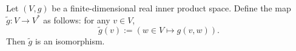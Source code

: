 \begin{proposition}
  Let $(V, g)$ be a finite-dimensional real inner product space.
  Define the map $\tilde{g} \colon V \to V^*$ as follows: for any $v \in V$,
  \begin{equation}
    \tilde{g}(v) := (w \in V \mapsto g(v, w)).
  \end{equation}
  Then $\tilde{g}$ is an isomorphism.
\end{proposition}
